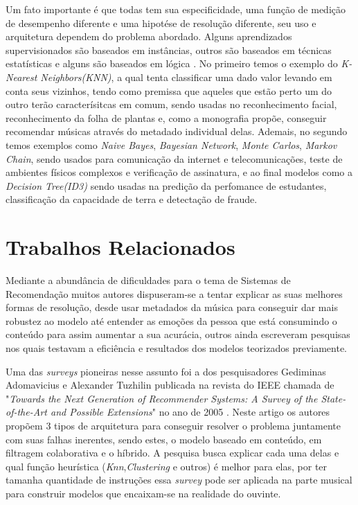 \documentclass[12pt, %
openright, 
oneside, %
a4paper,    %
brazil]{facom-ufu-abntex2}
\begin{document}
Um fato importante é que todas tem sua especificidade, uma função de medição de desempenho diferente e uma hipotése de resolução diferente, seu uso e arquitetura dependem do problema abordado. Alguns aprendizados supervisionados são baseados em instâncias, outros são baseados em técnicas estatísticas e alguns são baseados em lógica \cite{soofi2017classification}. No primeiro temos o exemplo do \textit{K-Nearest Neighbors(KNN)}, a qual tenta classificar uma dado valor levando em conta seus vizinhos, tendo como premissa que aqueles que estão perto um do outro terão caracterísitcas em comum, sendo usadas no reconhecimento facial, reconhecimento da folha de plantas e, como a monografia propõe, conseguir recomendar músicas através do metadado individual delas. Ademais, no segundo temos exemplos como \textit{Naive Bayes}, \textit{Bayesian Network}, \textit{Monte Carlos}, \textit{Markov Chain}, sendo usados para comunicação da internet e telecomunicações, teste de ambientes físicos complexos e verificação de assinatura, e ao final modelos como a \textit{Decision Tree(ID3)} sendo usadas na predição da perfomance de estudantes, classificação da capacidade de terra e detectação de fraude.



\chapter{Trabalhos Relacionados}


Mediante a abundância de dificuldades para o tema de Sistemas de Recomendação muitos autores dispuseram-se a tentar explicar as suas melhores formas de resolução, desde usar metadados da música para conseguir dar mais robustez ao modelo até entender as emoções da pessoa que está consumindo o conteúdo para assim aumentar a  sua acurácia, outros ainda escreveram pesquisas nos quais testavam a eficiência e resultados dos modelos teorizados previamente.

Uma das \textit{surveys} pioneiras nesse assunto foi a dos pesquisadores Gediminas Adomavicius e Alexander Tuzhilin publicada na revista do IEEE chamada de "\textit{Towards the Next Generation of Recommender Systems: A Survey of the State-of-the-Art and Possible Extensions}"  no ano de 2005 \cite{adomavicius2005toward}. Neste artigo os autores propõem 3 tipos de arquitetura para conseguir resolver o problema juntamente com suas falhas inerentes, sendo estes, o modelo baseado em conteúdo, em filtragem colaborativa e o híbrido. A pesquisa busca explicar cada uma delas e qual função heurística (\textit{Knn},\textit{Clustering} e outros) é melhor para elas, por ter tamanha quantidade de instruções essa \textit{survey} pode ser aplicada na parte musical para construir modelos que encaixam-se na realidade do ouvinte.
\end{document}
